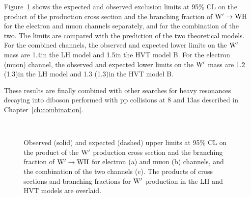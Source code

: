 Figure~\ref{fig:limitsFullCLS-WH} shows the expected and observed exclusion limits at 95\% CL on the product of the \Wpr production cross section and the branching fraction of $\mathrm{W}^\prime\to\mathrm{W}\mathrm{H}$ for the
electron and muon channels separately, and for the combination of the two. The limits are compared with the prediction of the two theoretical models.
For the combined channels, the observed and expected lower limits on the $\mathrm{W}^\prime$ mass are 1.4\TeV in the LH model and 1.5\TeV in the HVT model B.
For the electron (muon) channel, the observed and expected lower limits on the $\mathrm{W}^\prime$ mass are 1.2 (1.3)\TeV in the LH model and 1.3 (1.3)\TeV in the HVT model B.

These results are finally combined with other searches for heavy resonances decaying into diboson performed with pp collisions at 8 and 13\TeV as described in Chapter~\ref{ch:combination}.

 \begin{figure}[!t]
\centering
{}
\\
\caption{
  Observed (solid) and expected (dashed) upper limits at 95\% CL on the
  product of the $\mathrm{W}^\prime$ production cross section and the branching
  fraction of $\mathrm{W}^\prime\to\mathrm{W}\mathrm{H}$ for electron (a) and muon (b) channels,
  and the combination of the two channels (c). The products of cross sections and branching fractions for $\mathrm{W}^\prime$ production in the LH and HVT models are overlaid.
}
\label{fig:limitsFullCLS-WH}
\end{figure}